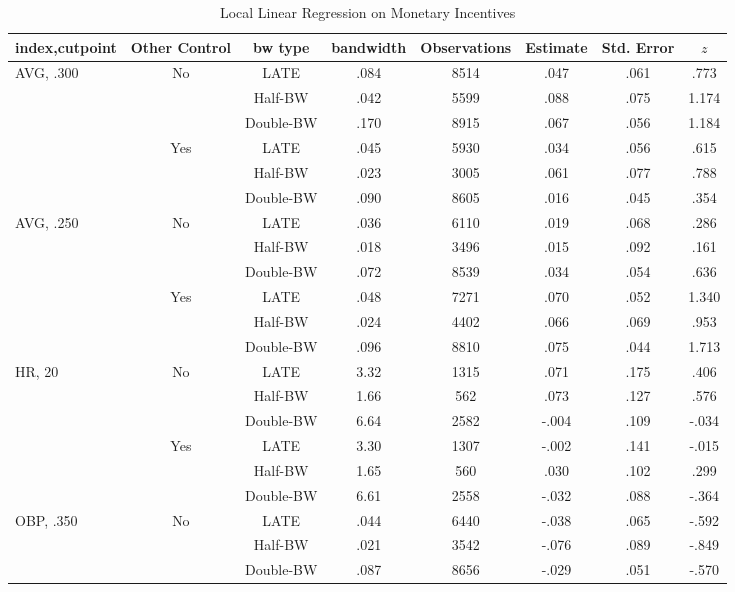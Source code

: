 \documentclass[dvipdfmx, 12pt]{article}
\begin{document}
\begin{table}[H]
  \caption{Local Linear Regression on Monetary Incentives}
  \label{RDD_A}
  \fontsize{9pt}{6pt}\selectfont
  \centering
  \begin{tabular}{@{\extracolsep{0pt}}lccccccc}\hline
    index,cutpoint & Other Control & bw type & bandwidth
    & Observations & Estimate & Std. Error & $z$
    \\ \hline \hline
    AVG, .300 & No &LATE & .084 & 8514 & .047 & .061 & .773 \\
    & &Half-BW &  .042 & 5599 & .088 & .075 & 1.174 \\
    & & Double-BW & .170 & 8915  & .067 & .056 & 1.184 \\ \cline{3-8}

    & Yes &LATE & .045 & 5930 & .034 & .056 & .615 \\
    & &Half-BW &  .023 & 3005 & .061 & .077 & .788 \\
    & & Double-BW & .090 & 8605  & .016 & .045 & .354 \\ \hline

    AVG, .250 & No &LATE & .036 & 6110 & .019 & .068 & .286 \\
    & &Half-BW &  .018 & 3496 & .015 & .092 & .161 \\
    & & Double-BW & .072 & 8539  & .034 & .054 & .636 \\ \cline{3-8}

    & Yes &LATE & .048 & 7271 & .070 & .052 & 1.340 \\
    & &Half-BW &  .024 & 4402 & .066 & .069 & .953 \\
    & & Double-BW & .096 & 8810  & .075 & .044 & 1.713 \\ \hline

    HR, 20 & No & LATE & 3.32 & 1315 & .071 & .175 & .406 \\
    & & Half-BW & 1.66 & 562 & .073 & .127 & .576 \\
    & & Double-BW & 6.64 & 2582 & -.004 & .109 & -.034 \\ \cline{3-8}

    & Yes & LATE & 3.30 & 1307 & -.002 & .141 & -.015\\
    & & Half-BW &1.65 & 560 & .030 & .102 & .299 \\
    & & Double-BW & 6.61 & 2558 & -.032 & .088 & -.364 \\ \hline

    OBP, .350 & No &LATE & .044 & 6440 & -.038 & .065 & -.592 \\
    & & Half-BW & .021 & 3542 & -.076 & .089 & -.849 \\
    & & Double-BW & .087 & 8656 & -.029 & .051 & -.570 \\ \cline{3-8}


\end{tabular}
\end{table}
\end{document}
